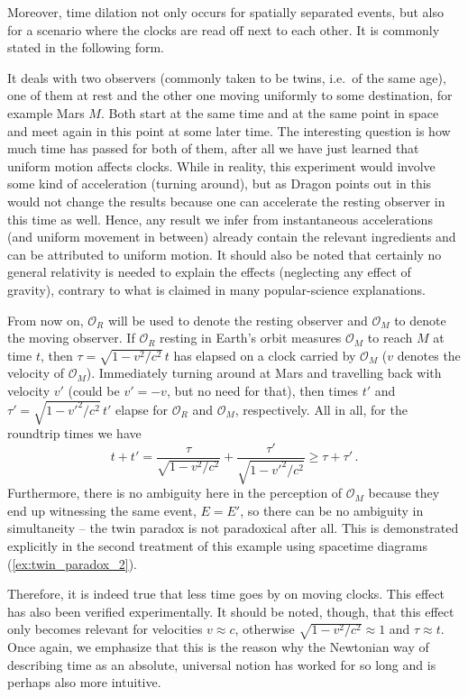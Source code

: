 Moreover, time dilation not only occurs for spatially separated events, but also for a scenario where the clocks are read off next to each other. It is commonly stated in the following form.
\begin{ex}\label{ex:twin_paradox_1}
	It deals with two observers (commonly taken to be twins, i.e.~of the same age), one of them at rest and the other one moving uniformly to some destination, for example Mars $M$. Both start at the same time and at the same point in space and meet again in this point at some later time. The interesting question is how much time has passed for both of them, after all we have just learned that uniform motion affects clocks. While in reality, this experiment would involve some kind of acceleration (turning around), but as Dragon points out in \cite{dragon_geometry_srt} this would not change the results because one can accelerate the resting observer in this time as well. Hence, any result we infer from instantaneous accelerations (and uniform movement in between) already contain the relevant ingredients and can be attributed to uniform motion. It should also be noted that certainly no general relativity is needed to explain the effects (neglecting any effect of gravity), contrary to what is claimed in many popular-science explanations.
	
	From now on, $\mathcal{O}_R$ will be used to denote the resting observer and $\mathcal{O}_M$ to denote the moving observer. If $\mathcal{O}_R$ resting in Earth's orbit measures $\mathcal{O}_M$ to reach $M$ at time $t$, then $\tau = \sqrt{1 - v^2 / c^2} \, t$ has elapsed on a clock carried by $\mathcal{O}_M$ ($v$ denotes the velocity of $\mathcal{O}_M$). Immediately turning around at Mars and travelling back with velocity $v'$ (could be $v' = -v$, but no need for that), then times $t'$ and $\tau' = \sqrt{1 - v'^2 / c^2} \, t'$ elapse for $\mathcal{O}_R$ and $\mathcal{O}_M$, respectively. All in all, for the roundtrip times we have
	\begin{equation*}
		t + t' = \frac{\tau}{\sqrt{1 - v^2 / c^2}} + \frac{\tau'}{\sqrt{1 - v'^2 / c^2}} \geq \tau + \tau' \, .
	\end{equation*}
	Furthermore, there is no ambiguity here in the perception of $\mathcal{O}_M$ because they end up witnessing the same event, $E = E'$, so there can be no ambiguity in simultaneity -- the twin paradox is not paradoxical after all. This is demonstrated explicitly in the second treatment of this example using spacetime diagrams (\ref{ex:twin_paradox_2}).
\end{ex}
Therefore, it is indeed true that less time goes by on moving clocks. This effect has also been verified experimentally. It should be noted, though, that this effect only becomes relevant for velocities $v \approx c$, otherwise $\sqrt{1 - v^2 / c^2} \approx 1$ and $\tau \approx t$. Once again, we emphasize that this is the reason why the Newtonian way of describing time as an absolute, universal notion has worked for so long and is perhaps also more intuitive.


